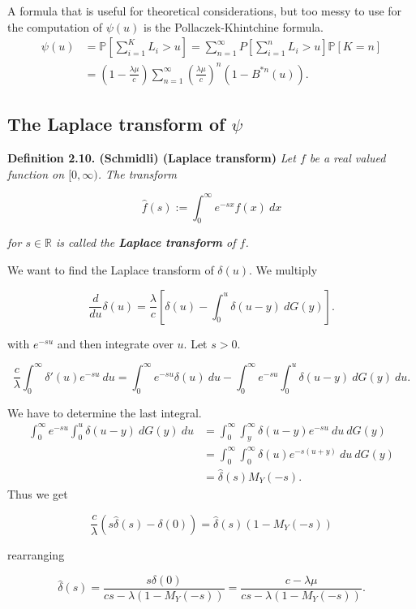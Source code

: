 \documentclass[a4paper,10pt,openany]{book}
\begin{document}
A formula that is useful for theoretical considerations, but too messy to use for the computation of \(\psi(u)\) is the Pollaczek-Khintchine formula.
\begin{align*}
\psi(u)&=\mathbb P\left[\sum_{i=1}^K L_i> u\right]=\sum_{n=1}^\infty P\left[\sum_{i=1}^n L_i> u\right]\mathbb P[K=n]\\
&=\left(1 − \frac{\lambda \mu}{c}\right)\sum_{n=1}^\infty\left(\frac{\lambda \mu}{c}\right)^n(1-B^{*n}(u)).
\end{align*}

\hypertarget{the-laplace-transform-of-psi}{%
\subsection{\texorpdfstring{The Laplace transform of \(\psi\)}{The Laplace transform of \textbackslash psi}}\label{the-laplace-transform-of-psi}}

\textbf{Definition 2.10. (Schmidli) (Laplace transform)} \emph{Let \(f\) be a real valued function on \([0,\infty)\). The transform}

\[
\hat f(s):=\int_0^\infty e^{-sx}f(x)\ dx
\]

\emph{for \(s\in\mathbb R\) is called the \textbf{Laplace transform} of \(f\).}

We want to find the Laplace transform of \(\delta (u)\). We multiply

\[
\frac{d}{du}\delta(u)=\frac{\lambda}{c}\left[\delta(u)-\int_0^u\delta(u-y)\ dG(y)\right].
\]

with \(e^{−su}\) and then integrate over \(u\). Let \(s > 0\).

\[
\frac{c}{\lambda}\int_0^\infty \delta'(u)e^{-su}\ du=\int_0^\infty e^{-su}\delta(u)\ du-\int_0^\infty e^{-su}\int_0^u\delta(u-y)\ dG(y)\ du.
\]

We have to determine the last integral.
\begin{align*}
\int_0^\infty e^{-su}\int_0^u\delta(u-y)\ dG(y)\ du&=\int_0^\infty\int_y^\infty\delta(u-y)e^{-su}\ du\ dG(y)\\
&=\int_0^\infty\int_0^\infty\delta(u)e^{-s(u+y)}\ du\ dG(y)\\
&=\hat \delta(s)M_Y(-s).
\end{align*}
Thus we get

\[
\frac{c}{\lambda}(s\hat \delta(s)-\delta(0))=\hat \delta(s)(1-M_Y(-s))
\]

rearranging

\[
\hat \delta(s)=\frac{s\delta(0)}{cs-\lambda(1-M_Y(-s))}=\frac{c-\lambda \mu}{cs-\lambda(1-M_Y(-s))}.
\]
\end{document}
